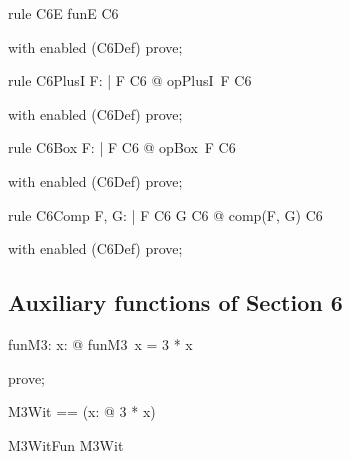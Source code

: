 \documentclass{article}
\begin{document}
\begin{theorem}{rule C6E}
  funE \in C6
\end{theorem}

\begin{zproof}
with enabled (C6Def) prove;
\end{zproof}

\begin{theorem}{rule C6PlusI}
  \forall F: \nat \fun \nat | F \in C6 @ opPlusI~F \in C6
\end{theorem}

\begin{zproof}
with enabled (C6Def) prove;
\end{zproof}

\begin{theorem}{rule C6Box}
  \forall F: \nat \fun \nat | F \in C6 @ opBox~F \in C6
\end{theorem}

\begin{zproof}
with enabled (C6Def) prove;
\end{zproof}

\begin{theorem}{rule C6Comp}
  \forall F, G: \nat \fun \nat | F \in C6 \land G \in C6 @ comp(F, G) \in C6
\end{theorem}

\begin{zproof}
with enabled (C6Def) prove;
\end{zproof}



\subsection{Auxiliary functions of Section 6}

\begin{axdef}
  funM3: \nat \fun \nat
\where
   \forall x: \nat @ funM3~x = 3 * x
\end{axdef}

\begin{zproof}
prove;
\end{zproof}

\begin{zed}
  M3Wit == (\lambda x: \nat @ 3 * x)
\end{zed}

\begin{theorem}{M3WitFun}
  M3Wit \in \nat \fun \nat
\end{theorem}
\end{document}
